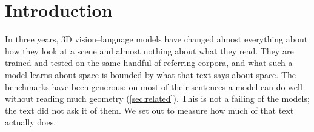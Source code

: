 \section{Introduction}
\label{sec:intro}


In three years, 3D vision--language models have changed almost everything about how they look at a scene and almost nothing about what they read. They are trained and tested on the same handful of referring corpora, and what such a model learns about space is bounded by what that text says about space. The benchmarks have been generous: on most of their sentences a model can do well without reading much geometry (\cref{sec:related}). This is not a failing of the models; the text did not ask it of them. We set out to measure how much of that text actually does.

